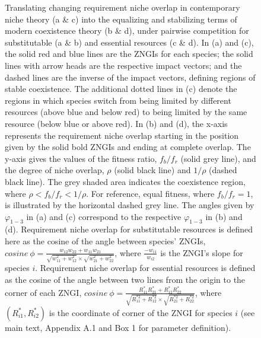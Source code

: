 \begin{figure}[h!]
	{\hspace{1mm}Translating changing requirement niche overlap in contemporary niche theory (a \& c) into the equalizing and stabilizing terms of modern coexistence theory (b \& d), under pairwise competition for substitutable (a \& b) and essential resources (c \& d). In (a) and (c), the solid red and blue lines are the ZNGIs for each species; the solid lines with arrow heads are the respective impact vectors; and the dashed lines are the inverse of the impact vectors, defining regions of stable coexistence. The additional dotted lines in (c) denote the regions in which species switch from being limited by different resources (above blue and below red) to being limited by the same resource (below blue or above red). In (b) and (d), the x-axis represents the requirement niche overlap starting in the position given by the solid bold ZNGIs and ending at complete overlap. The y-axis gives the values of the fitness ratio, $f_{b}/f_{r}$ (solid grey line), and the degree of niche overlap, $\rho$ (solid black line) and $1/\rho$ (dashed black line). The grey shaded area indicates the coexistence region, where $\rho<f_{b}/f_{r}<1/\rho$. For reference, equal fitness, where $f_{b}/f_{r}=1$, is illustrated by the horizontal dashed grey line. The angles given by $\varphi_{1-3}$ in (a) and (c) correspond to the respective $\varphi_{1-3}$ in (b) and (d). Requirement niche overlap for substitutable resources is defined here as the cosine of the angle between species' ZNGIs, $\mathit{cosine}\ \phi  = \frac{w_{12}w_{22}+w_{11}w_{21}}{\sqrt{w_{11}^{2}+w_{12}^{2}}\times \sqrt{w_{21}^{2}+w_{22}^{2}}}$, where $\frac{-w_{i1}}{w_{i2}}$ is the ZNGI's slope for species $\mathit{i}$. Requirement niche overlap for essential resources is defined as the cosine of the angle between two lines from the origin to the corner of each ZNGI, $\mathit{cosine}\ \phi  = \frac{R_{11}^{*}R_{21}^{*}+R_{12}^{*}R_{22}^{*}}{\sqrt{R_{11}^{*2}+R_{12}^{*2}}\times \sqrt{R_{21}^{*2}+R_{22}^{*2}}}$, where $\left (R_{i1}^{*}, R_{i2}^{*}\right )$ is the coordinate of corner of the ZNGI for species $\mathit{i}$ (see main text, Appendix A.1 and Box 1 for parameter definition).}
\label{fig:require-ms-fig-fixedequilibrium}
\end{figure}



